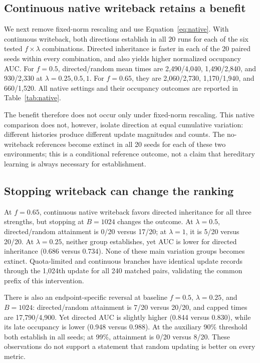 \documentclass[11pt]{article}
\begin{document}
\subsection{Continuous native writeback retains a benefit}
We next remove fixed-norm rescaling and use Equation~\ref{eq:native}. With continuous writeback, both directions establish in all 20 runs for each of the six tested $f\times\lambda$ combinations. Directed inheritance is faster in each of the 20 paired seeds within every combination, and also yields higher normalized occupancy AUC. For $f=0.5$, directed/random mean times are 2,490/4,040, 1,490/2,840, and 930/2,330 at $\lambda=0.25,0.5,1$. For $f=0.65$, they are 2,060/2,730, 1,170/1,940, and 660/1,520. All native settings and their occupancy outcomes are reported in Table~\ref{tab:native}.

The benefit therefore does not occur only under fixed-norm rescaling. This native comparison does not, however, isolate direction at equal cumulative variation: different histories produce different update magnitudes and counts. The no-writeback references become extinct in all 20 seeds for each of these two environments; this is a conditional reference outcome, not a claim that hereditary learning is always necessary for establishment.

\subsection{Stopping writeback can change the ranking}
At $f=0.65$, continuous native writeback favors directed inheritance for all three strengths, but stopping at $B=1024$ changes the outcome. At $\lambda=0.5$, directed/random attainment is 0/20 versus 17/20; at $\lambda=1$, it is 5/20 versus 20/20. At $\lambda=0.25$, neither group establishes, yet AUC is lower for directed inheritance (0.686 versus 0.734). None of these main variation groups becomes extinct. Quota-limited and continuous branches have identical update records through the 1,024th update for all 240 matched pairs, validating the common prefix of this intervention.

There is also an endpoint-specific reversal at baseline $f=0.5$, $\lambda=0.25$, and $B=1024$: directed/random attainment is 7/20 versus 20/20, and capped times are 17,790/4,900. Yet directed AUC is slightly higher (0.844 versus 0.830), while its late occupancy is lower (0.948 versus 0.988). At the auxiliary 90\% threshold both establish in all seeds; at 99\%, attainment is 0/20 versus 8/20. These observations do not support a statement that random updating is better on every metric.
\end{document}
